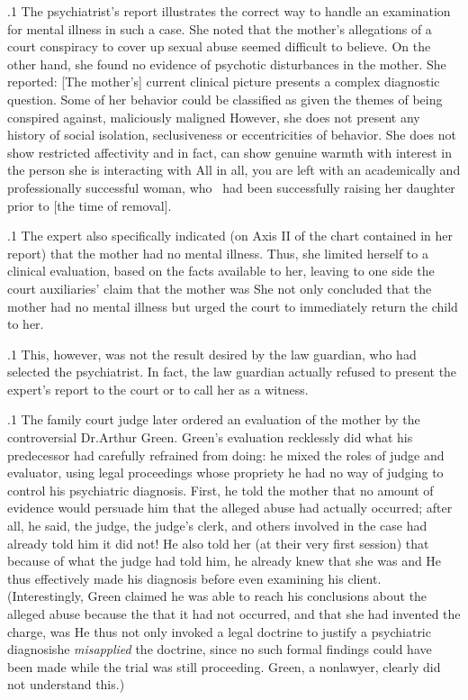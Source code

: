 \documentclass[11pt, twoside]{article}
\begin{document}
{\p.1{%
The psychiatrist’s report illustrates the correct way to handle an examination for mental illness in such a case. She noted that the mother’s
allegations of a court conspiracy to cover up sexual abuse seemed difficult to believe. On the other hand, she found no evidence of psychotic
disturbances in the mother. She reported:
[The mother’s] current clinical picture presents a complex diagnostic question. Some of her behavior could be classified as 
given the themes of being conspired against, maliciously maligned\ellFour{2pt}{2pt} However, she does not present any history of social
isolation, seclusiveness or eccentricities of behavior. She does not
show restricted affectivity and in fact, can show genuine warmth
with interest in the person she is interacting with\ellFour{2pt}{2pt} All in all, you
are left with an academically and professionally successful woman,
who \ellThree{2pt}{2pt}\ had been successfully raising her daughter prior to [the
time of removal].
}%

\p.1{%
The expert also specifically indicated (on Axis II of the  chart contained in her report) that the mother had no mental illness. Thus, she limited herself to a clinical evaluation, based on the
facts available to her, leaving to one side the court auxiliaries’ claim that
the mother was  She not only concluded that the mother
had no mental illness but urged the court to immediately return the child
to her.
}%

\p.1{%
This, however, was not the result desired by the law guardian, who
had selected the psychiatrist. In fact, the law guardian actually refused to present the expert’s report to the court or to call her as a
witness.
}%

\p.1{%
The family court judge later ordered an evaluation of the mother by
the controversial Dr.\@ Arthur Green. Green’s evaluation recklessly did what his
predecessor had carefully refrained from doing: he mixed the roles of
judge and evaluator, using legal proceedings whose propriety he had no
way of judging to control his psychiatric diagnosis. First, he told the
mother that no amount of evidence would persuade him that the alleged abuse had actually occurred; after all, he said, the judge, the judge’s
clerk, and others involved in the case had already told him it did not!
He also told her (at their very first session) that because of what the
judge had told him, he already knew that she was  and  He thus effectively made his diagnosis before even examining his
client. (Interestingly, Green claimed he was able to reach his conclusions
about the alleged abuse because the  that it had not occurred,
and that she had invented the charge, was  He thus
not only invoked a legal doctrine to justify a psychiatric diagnosis\mdash{}he
\textit{misapplied} the doctrine, since no such formal findings could have been
made while the trial was still proceeding. Green, a nonlawyer, clearly
did not understand this.)
}%

}
\end{document}
